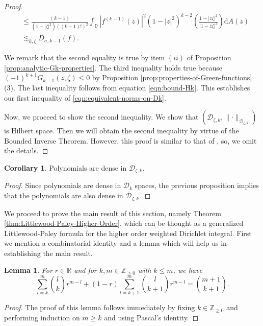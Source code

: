 \documentclass[10pt,oneside,reqno]{amsart}
\newtheorem{lemma}[theorem]{Lemma}
\theoremstyle{definition}
\newtheorem{corollary}[theorem]{Corollary}
\theoremstyle{remark}
\newcommand{\abs}[1]{\left\lvert #1 \right\rvert}
\renewcommand{\le}{\leqslant}
\renewcommand{\ge}{\geqslant}
\newcommand{\R}{\mathbb R}
\newcommand{\D}{\mathbb D}
\numberwithin{equation}{section}
\begin{document}
\begin{proof}
\begin{align*}
	&\le  \frac{\left( k-1 \right)}{(1-\abs{\zeta}^2) ((k-1)!)^2} \int_{\D} \abs{f^{\left( k-1 \right)}\left( z \right)}^{2} \left( 1-\abs{z}^{2} \right)^{k-2} \left( \frac{1-\abs{z\zeta}^{2}}{\abs{1-\overline{z}\zeta}^{2}} \right) \mathrm{d}A\left( z \right) \\
	&\lesssim_{k, \zeta} D_{\sigma, k-1} \left( f \right).
    \end{align*}
    
    We remark that the second equality is true by item $(ii)$ of Proposition \ref{prop:analytic-Gk-properties}. The third inequality holds true because $(-1)^{k+1} G_{k-1} (z, \zeta) \le 0$ by Proposition \ref{prop:properties-of-Green-functions} (3). The last inequality follows from equation \eqref{eqn:bound-Hk}. This establishes our first inequality of \eqref{eqn:equivalent-norms-on-Dk}.

        Now, we proceed to show the second inequality.  We show that $\left( \mathscr{D}_{\zeta, k}, \lVert \cdot \rVert _{\mathscr D_{\zeta, k}} \right)$ is Hilbert space. Then we will obtain the second inequality by virtue of the Bounded Inverse Theorem. However, this proof is similar to that of \cite[Theorem 1.6.3]{Primerbook}, so, we omit the details. 
\end{proof}

\begin{corollary}
    Polynomials are dense in $\mathscr D_{\zeta, k}$.
\end{corollary}
\begin{proof}
    Since polynomials are dense in $\mathscr{D}_{k}$ spaces, the previous proposition implies that the polynomials are also dense in $\mathscr D_{\zeta, k}.$
\end{proof}

We proceed to prove the main result of this section, namely Theorem \ref{thm:Littlewood-Paley-Higher-Order}, which can be thought as a generalized Littlewood-Paley formula for the higher order weighted Dirichlet integral. First we mention a  combinatorial identity and a lemma which will help us in establishing the main result.

\begin{lemma} For $r \in \R$ and for $k, m \in \mathbb Z _{\ge 0}$ with $k\le m$, we have
    \begin{equation*}
    \sum _{l=k}^m \binom{l}{k} r^{m-l}+(1-r) \sum _{l=k+1}^m \binom{l}{k+1} r^{m-l} = \binom{m+1}{k+1}.
\end{equation*}
\label{lem:sum-lem}
\end{lemma}
\begin{proof}
    
The proof of this lemma follows immediately by fixing $k \in \mathbb{Z}_{\ge 0}$ and performing induction on $m \ge k$ and using Pascal's identity.

\end{proof}
\end{document}
